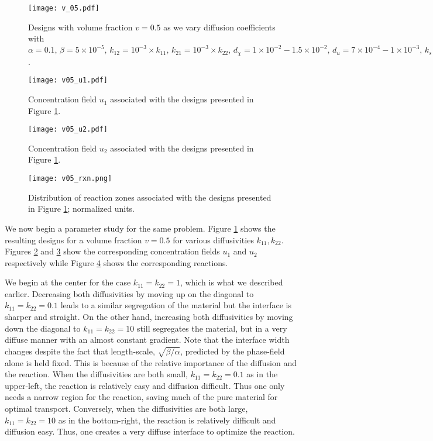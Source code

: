 \documentclass[11pt]{article}
\begin{document}
\begin{figure}
\centering     
    \texttt{[image: v\_05.pdf]}
    \caption{Designs with volume fraction $v=0.5$ as we vary diffusion coefficients with $\alpha=0.1,\,\beta=5\times10^{-5},\,k_{12}=10^{-3}\times k_{11},\,k_{21}=10^{-3}\times k_{22},\, d_\chi=1\times10^{-2}-1.5\times10^{-2},\,d_u=7\times10^{-4}-1\times10^{-3},\,k_s=1\times10^2$.  \label{fig:v05} 
}
\end{figure}

\begin{figure}
\centering     
    \texttt{[image: v05\_u1.pdf]}
    \caption{Concentration field $u_1$ associated with the designs presented in Figure \ref{fig:v05}.
    \label{fig:v05_u1} }
    \end{figure}

\begin{figure}
\centering     
    \texttt{[image: v05\_u2.pdf]}
    \caption{Concentration field $u_2$ associated with the designs presented in Figure \ref{fig:v05}.
    \label{fig:v05_u2} }
\end{figure}

\begin{figure}
\centering     
    \texttt{[image: v05\_rxn.png]}
    \caption{Distribution of reaction zones associated with the designs presented in Figure \ref{fig:v05}; normalized units.
    \label{fig:v05_rxn} 
}
\end{figure}

We now begin a parameter study for the same problem. Figure \ref{fig:v05} shows the resulting designs for a volume fraction $v = 0.5$ for various diffusivities $k_{11}, k_{22}$. Figures \ref{fig:v05_u1} and \ref{fig:v05_u2} show the corresponding concentration fields $u_1$ and $u_2$ respectively while Figure \ref{fig:v05_rxn} shows the corresponding reactions.

We begin at the center for the case $k_{11} = k_{22} = 1$, which is what we described earlier.  Decreasing both diffusivities by moving up on the diagonal to $k_{11} = k_{22}=0.1$ leads to a similar segregation of the material but the interface is sharper and straight.  On the other hand, increasing both diffusivities by moving down the diagonal to $k_{11} = k_{22}=10$ still segregates the material, but in a very diffuse manner with an almost constant gradient.  Note that the interface width  changes despite the fact that length-scale, $\sqrt{\beta/\alpha}$, predicted by the phase-field alone is held fixed.  This is because of the relative importance of the diffusion and the reaction.  When the diffusivities are both small, $k_{11} = k_{22}=0.1$ as in the upper-left, the reaction is relatively easy and diffusion difficult.  Thus one only needs a narrow region for the reaction, saving much of the pure material for optimal transport.  Conversely, when the diffusivities are both large, $k_{11} = k_{22}=10$ as in the bottom-right, the reaction is relatively difficult and diffusion easy.  Thus, one creates a very diffuse interface to optimize the reaction.
\end{document}

